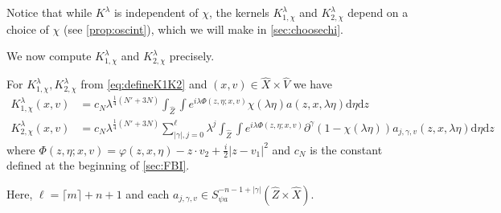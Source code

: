 \documentclass[
	fontsize=11pt, 
	twoside=false, 
	abstract=true, 
	a4paper,
]{scrartcl}
\newcommand{\dd}{\mathrm{d}}
\newcommand{\abs}[1]{\left\lvert#1\right\rvert}
\newcommand{\del}{\partial}
\begin{document}
Notice that while $K^\lambda$ is independent of $\chi$, the kernels $K^\lambda_{1,\chi}$ and $K^\lambda_{2,\chi}$ depend on a choice of $\chi$ (see \cref{prop:oscint}), which we will make in \cref{sec:choosechi}.

We now compute $K^\lambda_{1,\chi}$ and $K^\lambda_{2,\chi}$ precisely.

\begin{lemma}\label{cor:calcKernel}
	For $K_{1,\chi}^\lambda,K_{2,\chi}^\lambda$ from \cref{eq:defineK1K2} and $(x,v)\in \hat X\times \hat V$ we have
\begin{align}
	K_{1,\chi}^\lambda(x,v) &= c_{N}\lambda^{\frac{1}{4}(N'+3N)}\int_{\hat Z}\int e^{i\lambda\Phi(z,\eta;x,v)}\chi(\lambda\eta)a(z,x,\lambda\eta)\dd\eta\dd z \label{eq:K1}\\
	K_{2,\chi}^\lambda(x,v) &= c_{N}\lambda^{\frac{1}{4}(N'+3N)}\sum_{\abs{\gamma},j=0}^{\ell} \lambda^j \int_{\hat Z}\int e^{i\lambda\Phi(z,\eta;x,v)} \del^\gamma (1-\chi(\lambda\eta)) a_{j,\gamma,v}(z,x,\lambda\eta)\dd\eta\dd z \label{eq:K21}%
\end{align}
	where $\Phi(z,\eta;x,v) = \varphi(z,x,\eta)-z\cdot v_2+\frac{i}{2}\abs{z-v_1}^2$ and $c_N$ is the constant defined at the beginning of \cref{sec:FBI}.
	
	Here, $\ell = \lceil m\rceil +n+1$ and each $a_{j,\gamma,v} \in S^{-n-1+\abs{\gamma}}_{\psi a}(\hat Z\times \hat X)$.%
\end{lemma}
\end{document}
